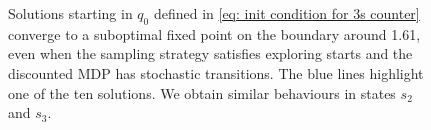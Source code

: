 \begin{figure}[b!]
            
            
    
    \caption{Solutions starting in $q_0$ defined in \eqref{eq: init condition for 3s counter} converge to a suboptimal fixed point on the boundary around 1.61, even when the sampling strategy satisfies exploring starts and the discounted MDP has stochastic transitions.
    The blue lines highlight one of the ten solutions.
    We obtain similar behaviours in states $s_2$ and $s_3$.}
    \label{fig: 3s IV ES ST}
\end{figure}